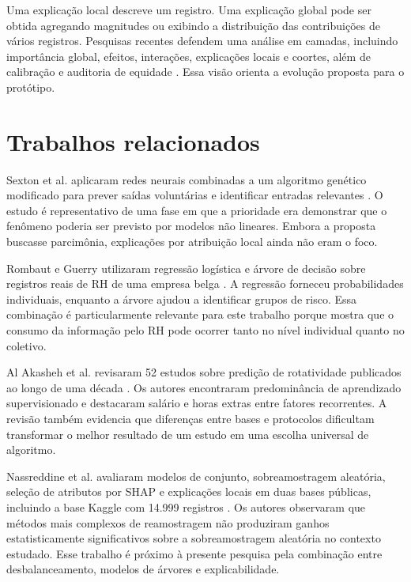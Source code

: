 \documentclass[12pt]{article}
\begin{document}
Uma explicação local descreve um registro. Uma explicação global pode ser obtida agregando magnitudes ou exibindo a distribuição das contribuições de vários registros. Pesquisas recentes defendem uma análise em camadas, incluindo importância global, efeitos, interações, explicações locais e coortes, além de calibração e auditoria de equidade \cite{jia2026explainable}. Essa visão orienta a evolução proposta para o protótipo.

\section{Trabalhos relacionados}
\label{sec:relacionados}

Sexton et al. aplicaram redes neurais combinadas a um algoritmo genético modificado para prever saídas voluntárias e identificar entradas relevantes \cite{sexton2005turnover}. O estudo é representativo de uma fase em que a prioridade era demonstrar que o fenômeno poderia ser previsto por modelos não lineares. Embora a proposta buscasse parcimônia, explicações por atribuição local ainda não eram o foco.

Rombaut e Guerry utilizaram regressão logística e árvore de decisão sobre registros reais de RH de uma empresa belga \cite{rombaut2018predicting}. A regressão forneceu probabilidades individuais, enquanto a árvore ajudou a identificar grupos de risco. Essa combinação é particularmente relevante para este trabalho porque mostra que o consumo da informação pelo RH pode ocorrer tanto no nível individual quanto no coletivo.

Al Akasheh et al. revisaram 52 estudos sobre predição de rotatividade publicados ao longo de uma década \cite{akasheh2024decade}. Os autores encontraram predominância de aprendizado supervisionado e destacaram salário e horas extras entre fatores recorrentes. A revisão também evidencia que diferenças entre bases e protocolos dificultam transformar o melhor resultado de um estudo em uma escolha universal de algoritmo.

Nassreddine et al. avaliaram modelos de conjunto, sobreamostragem aleatória, seleção de atributos por SHAP e explicações locais em duas bases públicas, incluindo a base Kaggle com 14.999 registros \cite{nassreddine2026attrition}. Os autores observaram que métodos mais complexos de reamostragem não produziram ganhos estatisticamente significativos sobre a sobreamostragem aleatória no contexto estudado. Esse trabalho é próximo à presente pesquisa pela combinação entre desbalanceamento, modelos de árvores e explicabilidade.
\end{document}
